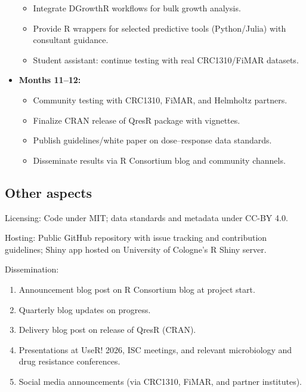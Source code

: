 \documentclass[
  letterpaper,
  DIV=11,
  numbers=noendperiod]{scrartcl}
\providecommand{\tightlist}{%
  \setlength{\itemsep}{0pt}\setlength{\parskip}{0pt}}
\begin{document}
\begin{itemize}
  \begin{itemize}
  \tightlist
  \item
    Integrate DGrowthR workflows for bulk growth analysis.
  \item
    Provide R wrappers for selected predictive tools (Python/Julia) with
    consultant guidance.
  \item
    Student assistant: continue testing with real CRC1310/FiMAR
    datasets.
  \end{itemize}
\item
  \textbf{Months 11--12:}

  \begin{itemize}
  \tightlist
  \item
    Community testing with CRC1310, FiMAR, and Helmholtz partners.
  \item
    Finalize CRAN release of QresR package with vignettes.
  \item
    Publish guidelines/white paper on dose--response data standards.
  \item
    Disseminate results via R Consortium blog and community channels.
  \end{itemize}
\end{itemize}

\subsection{Other aspects}\label{other-aspects}

Licensing: Code under MIT; data standards and metadata under CC-BY 4.0.

Hosting: Public GitHub repository with issue tracking and contribution
guidelines; Shiny app hosted on University of Cologne's R Shiny server.

Dissemination:

\begin{enumerate}
\def\labelenumi{\arabic{enumi}.}
\tightlist
\item
  Announcement blog post on R Consortium blog at project start.
\item
  Quarterly blog updates on progress.
\item
  Delivery blog post on release of QresR (CRAN).
\item
  Presentations at UseR! 2026, ISC meetings, and relevant microbiology
  and drug resistance conferences.
\item
  Social media announcements (via CRC1310, FiMAR, and partner
  institutes).
\end{enumerate}
\end{document}
